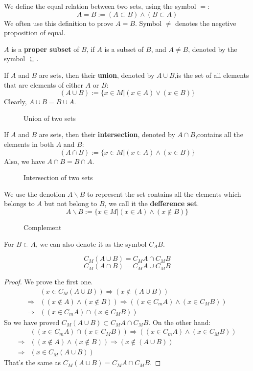 We define the equal relation between two sets, using the symbol $=$:
\[A=B :=(A\subset B)\wedge(B\subset A)\]
We often use this definition to prove $A=B$.
Symbol $\neq$ denotes the negetive proposition of equal.

$A$ is a \textbf{proper subset} of $B$, if $A$ is a subset of $B$, and $A\neq B$, denoted by the symbol $\subseteq $.

If $A$ and $B$ are sets, then their \textbf{union}, denoted by $A \cup  B$,is the set of all elements that are elements of either $A$ or $B$:
\[(A\cup B):=\{x\in M|(x\in A)\vee (x\in B)\}\]
Clearly, $A\cup B=B\cup A$.
\begin{figure}
    \centering
    \caption{Union of two sets}
    
\end{figure}

If $A$ and $B$ are sets, then their \textbf{intersection}, denoted by $A \cap  B$,contains all the elements in both $A$ and $B$:
\[(A\cap B):=\{x\in M|(x\in A)\wedge (x\in B)\}\]
Also, we have $A\cap B=B\cap A$.
\begin{figure}[h] 
    \centering
    \caption{Intersection of two sets}
    
\end{figure}

We use the denotion $A\backslash B$ to represent the set contains all the elements which belongs to $A$ but not belong to $B$, we call it the \textbf{defference set}.
\[A\backslash B:=\{x\in M|(x\in A)\wedge(x\not\in B)\}\]
\begin{figure}[ht]
    \centering
    \caption{Complement}
    
\end{figure}

For $B\subset A$, we can also denote it as the symbol $C_{A}B$.

\begin{question}[de Morgen]
    \[C_{M}(A\cup B)=C_{M}A\cap C_{M}B\]
    \[C_{M}(A\cap B)=C_{M}A\cup C_{M}B\]
\end{question}
\begin{proof}We prove the first one.
    \[
    \begin{aligned}
        &(x\in C_{M}(A\cup B))\Rightarrow (x \not\in (A\cup B))\\ \Rightarrow& ((x\not\in A)\wedge(x\not\in B))
        \Rightarrow((x\in C_{m}A)\wedge(x\in C_{M}B))\\ \Rightarrow&((x\in C_{m}A)\cap(x\in C_{M}B))
    \end{aligned}\]
    So we have proved $C_{M}(A\cup B)\subset C_{M}A\cap C_{M}B$. On the other hand:
    \[\begin{aligned}
        &((x\in C_{m}A)\cap(x\in C_{M}B))\Rightarrow ((x\in C_{m}A)\wedge(x\in C_{M}B))\\ \Rightarrow& ((x\not\in A)\wedge(x\not\in B))\Rightarrow (x \not\in (A\cup B))\\ \Rightarrow&(x\in C_{M}(A\cup B))
    \end{aligned}\]
    That's the same as $C_{M}(A\cup B)=C_{M}A\cap C_{M}B$.
\end{proof}


